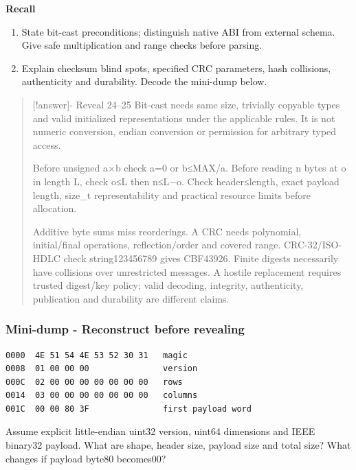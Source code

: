 \textbf{Recall}

\begin{enumerate}
\def\labelenumi{\arabic{enumi}.}
\setcounter{enumi}{23}
\tightlist
\item
  State bit-cast preconditions; distinguish native ABI from external schema. Give safe multiplication and range checks before parsing.
\item
  Explain checksum blind spots, specified CRC parameters, hash collisions, authenticity and durability. Decode the mini-dump below.
\end{enumerate}

\begin{quote}
{[}!answer{]}- Reveal 24--25 Bit-cast needs same size, trivially copyable types and valid initialized representations under the applicable rules. It is not numeric conversion, endian conversion or permission for arbitrary typed access.

Before unsigned a×b check a=0 or b≤MAX/a. Before reading n bytes at o in length L, check o≤L then n≤L−o. Check header≤length, exact payload length, size\_t representability and practical resource limits before allocation.

Additive byte sums miss reorderings. A CRC needs polynomial, initial/final operations, reflection/order and covered range. CRC-32/ISO-HDLC check string123456789 gives CBF43926. Finite digests necessarily have collisions over unrestricted messages. A hostile replacement requires trusted digest/key policy; valid decoding, integrity, authenticity, publication and durability are different claims.
\end{quote}

\subsubsection{Mini-dump - Reconstruct before revealing}\label{appendix-ef4d27797a92-mini-dump---reconstruct-before-revealing}

\hypertarget{appendix-ef4d27797a92-mini-dump---reconstruct-before-revealing}{}

\begin{verbatim}
0000  4E 51 54 4E 53 52 30 31   magic
0008  01 00 00 00               version
000C  02 00 00 00 00 00 00 00   rows
0014  03 00 00 00 00 00 00 00   columns
001C  00 00 80 3F               first payload word
\end{verbatim}

Assume explicit little-endian uint32 version, uint64 dimensions and IEEE binary32 payload. What are shape, header size, payload size and total size? What changes if payload byte80 becomes00?

